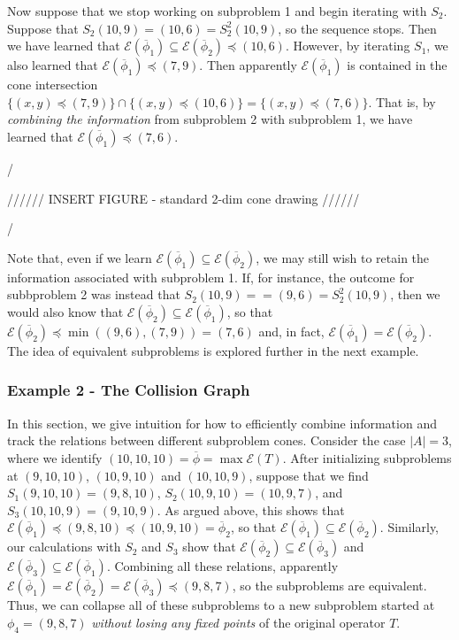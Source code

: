 \documentclass[11pt,reqno]{amsart}
\theoremstyle{definition}
\numberwithin{equation}{section}
\newcommand{\ol}{\overline}
\newcommand{\pre}{\phi}
\newcommand{\sub}{\subseteq}
\newcommand{\fix}{\mathcal{E}}
\newcommand{\peq}{\preceq}
\newcommand{\toppre}{\ol{\pre}}
\begin{document}
Now suppose that we stop working on subproblem 1 and begin iterating with $S_2$.
Suppose that $S_2(10,9) = (10,6) = S_2^2(10,9)$, so the sequence stops.
Then we have learned that $\fix(\toppre_1) \sub \fix(\toppre_2) \peq (10,6)$. 
However, by iterating $S_1$, we also learned that $\fix(\toppre_1) \peq (7,9)$. 
Then apparently $\fix(\toppre_1)$ is contained in the cone intersection $\{(x,y) \peq (7,9)\} \cap \{(x,y) \peq (10, 6)\} = \{(x,y) \peq (7,6) \}$. 
That is, by \emph{combining the information} from subproblem 2 with subproblem 1, we have learned that $\fix(\toppre_1) \peq (7,6)$. 

/

////// INSERT FIGURE - standard 2-dim cone drawing  //////

/

Note that, even if we learn $\fix(\toppre_1) \sub \fix(\toppre_2)$, we may still wish to retain the information associated with subproblem 1. 
If, for instance, the outcome for subbproblem 2 was instead that $S_2(10,9) =  = (9,6) = S_2^2(10,9)$, then we would also know that $\fix(\toppre_2) \sub \fix(\toppre_1)$, so that $\fix(\toppre_2) \peq \min((9,6),(7,9)) = (7,6)$ and, in fact, $\fix(\toppre_1) = \fix(\toppre_2)$.
The idea of equivalent subproblems is explored further in the next example. 

\subsubsection{Example 2 - The Collision Graph}
In this section, we give intuition for how to efficiently combine information and track the relations between different subproblem cones. 
Consider the case $|A| = 3$, where we identify $(10,10,10) = \toppre = \max \fix(T)$. 
After initializing subproblems at $(9,10,10)$, $(10,9,10)$ and $(10,10,9)$, suppose that we find $S_1(9,10,10) = (9,8,10)$, $S_2(10,9,10) = (10,9,7)$, and $S_3(10,10,9) = (9,10,9)$. 
As argued above, this shows that $\fix(\toppre_1) \peq (9,8,10) \peq (10,9,10) = \toppre_2$, so that $\fix(\toppre_1) \sub \fix(\toppre_2)$. 
Similarly, our calculations with $S_2$ and $S_3$ show that $\fix(\toppre_2) \sub \fix(\toppre_3)$ and $\fix(\toppre_3) \sub \fix(\toppre_1)$. 
Combining all these relations, apparently $\fix(\toppre_1) = \fix(\toppre_2) = \fix(\toppre_3) \peq (9,8,7)$, so the subproblems are equivalent.  
Thus, we can collapse all of these subproblems to a new subproblem started at $\pre_4 = (9,8,7)$ \emph{without losing any fixed points} of the original operator $T$. 
\end{document}

